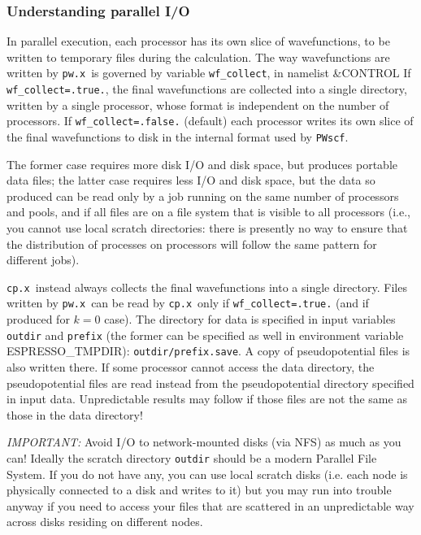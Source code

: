 \documentclass[12pt,a4paper]{article}
\def\pw.x{\texttt{pw.x}}
\def\cp.x{\texttt{cp.x}}
\def\PWscf{\texttt{PWscf}}
\begin{document}
\subsubsection{Understanding parallel I/O}
In parallel execution, each processor has its own slice of wavefunctions, 
to be written to temporary files during the calculation. The way wavefunctions 
are written by \pw.x\ is governed by variable \texttt{wf\_collect}, 
in namelist \&CONTROL 
If \texttt{wf\_collect=.true.}, the final wavefunctions are collected into a single 
directory, written by a single processor, whose format is independent on 
the number of processors. If \texttt{wf\_collect=.false.} (default) each processor
writes its own slice of the final 
wavefunctions to disk in the internal format used by \PWscf. 

The former case requires more
disk I/O and disk space, but produces portable data files; the latter case
requires less I/O and disk space, but the data so produced can be read only
by a job running on the same number of processors and pools, and if
all files are on a file system that is visible to all processors
(i.e., you cannot use local scratch directories: there is presently no
way to ensure that the distribution of processes on processors will
follow the same pattern for different jobs).

\cp.x\ instead always collects the final wavefunctions into a single directory.
Files written by \pw.x\ can be read by \cp.x\ only if \texttt{wf\_collect=.true.} (and if
produced for $k=0$ case). 
The directory for data is specified in input variables
\texttt{outdir} and \texttt{prefix} (the former can be specified
as well in environment variable ESPRESSO\_TMPDIR):
\texttt{outdir/prefix.save}. A copy of pseudopotential files
is also written there. If some processor cannot access the
data directory, the pseudopotential files are read instead
from the pseudopotential directory specified in input data.
Unpredictable results may follow if those files
are not the same as those in the data directory!

{\em IMPORTANT:}
Avoid I/O to network-mounted disks (via NFS) as much as you can! 
Ideally the scratch directory \texttt{outdir} should be a modern 
Parallel File System. If you do not have any, you can use local
scratch disks (i.e. each node is physically connected to a disk
and writes to it) but you may run into trouble anyway if you 
need to access your files that are scattered in an unpredictable
way across disks residing on different nodes.
\end{document}
